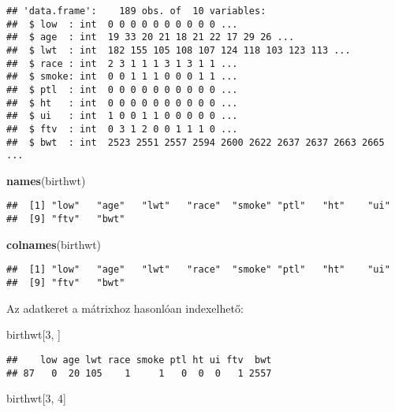 \documentclass[]{book}
\newenvironment{Shaded}{\begin{snugshade}}{\end{snugshade}}
\newcommand{\KeywordTok}[1]{\textcolor[rgb]{0.13,0.29,0.53}{\textbf{#1}}}
\newcommand{\DecValTok}[1]{\textcolor[rgb]{0.00,0.00,0.81}{#1}}
\newcommand{\NormalTok}[1]{#1}
\begin{document}
\begin{verbatim}
## 'data.frame':    189 obs. of  10 variables:
##  $ low  : int  0 0 0 0 0 0 0 0 0 0 ...
##  $ age  : int  19 33 20 21 18 21 22 17 29 26 ...
##  $ lwt  : int  182 155 105 108 107 124 118 103 123 113 ...
##  $ race : int  2 3 1 1 1 3 1 3 1 1 ...
##  $ smoke: int  0 0 1 1 1 0 0 0 1 1 ...
##  $ ptl  : int  0 0 0 0 0 0 0 0 0 0 ...
##  $ ht   : int  0 0 0 0 0 0 0 0 0 0 ...
##  $ ui   : int  1 0 0 1 1 0 0 0 0 0 ...
##  $ ftv  : int  0 3 1 2 0 0 1 1 1 0 ...
##  $ bwt  : int  2523 2551 2557 2594 2600 2622 2637 2637 2663 2665 ...
\end{verbatim}

\begin{Shaded}
\begin{Highlighting}[]
\KeywordTok{names}\NormalTok{(birthwt)}
\end{Highlighting}
\end{Shaded}

\begin{verbatim}
##  [1] "low"   "age"   "lwt"   "race"  "smoke" "ptl"   "ht"    "ui"   
##  [9] "ftv"   "bwt"
\end{verbatim}

\begin{Shaded}
\begin{Highlighting}[]
\KeywordTok{colnames}\NormalTok{(birthwt)}
\end{Highlighting}
\end{Shaded}

\begin{verbatim}
##  [1] "low"   "age"   "lwt"   "race"  "smoke" "ptl"   "ht"    "ui"   
##  [9] "ftv"   "bwt"
\end{verbatim}

Az adatkeret a mátrixhoz hasonlóan indexelhető:

\begin{Shaded}
\begin{Highlighting}[]
\NormalTok{birthwt[}\DecValTok{3}\NormalTok{, ]}
\end{Highlighting}
\end{Shaded}

\begin{verbatim}
##    low age lwt race smoke ptl ht ui ftv  bwt
## 87   0  20 105    1     1   0  0  0   1 2557
\end{verbatim}

\begin{Shaded}
\begin{Highlighting}[]
\NormalTok{birthwt[}\DecValTok{3}\NormalTok{, }\DecValTok{4}\NormalTok{]}
\end{Highlighting}
\end{Shaded}
\end{document}
